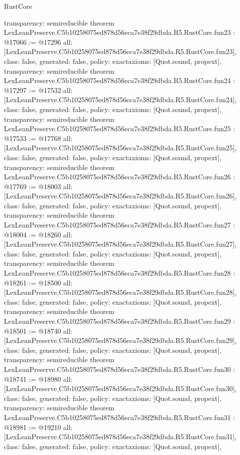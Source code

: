 \begin{lexlean}{RustCore}
\begin{coremodule}
{  transparency: semireducible
}
theorem LexLeanPreserve.C5b10258075ed878d56eca7e38f29dbda.R5.RustCore.fun23 : @17066 := @17296 {
  all: [LexLeanPreserve.C5b10258075ed878d56eca7e38f29dbda.R5.RustCore.fun23],
  class: false,
  generated: false,
  policy: exact{axioms: [Quot.sound, propext]},
  transparency: semireducible
}
theorem LexLeanPreserve.C5b10258075ed878d56eca7e38f29dbda.R5.RustCore.fun24 : @17297 := @17532 {
  all: [LexLeanPreserve.C5b10258075ed878d56eca7e38f29dbda.R5.RustCore.fun24],
  class: false,
  generated: false,
  policy: exact{axioms: [Quot.sound, propext]},
  transparency: semireducible
}
theorem LexLeanPreserve.C5b10258075ed878d56eca7e38f29dbda.R5.RustCore.fun25 : @17533 := @17768 {
  all: [LexLeanPreserve.C5b10258075ed878d56eca7e38f29dbda.R5.RustCore.fun25],
  class: false,
  generated: false,
  policy: exact{axioms: [Quot.sound, propext]},
  transparency: semireducible
}
theorem LexLeanPreserve.C5b10258075ed878d56eca7e38f29dbda.R5.RustCore.fun26 : @17769 := @18003 {
  all: [LexLeanPreserve.C5b10258075ed878d56eca7e38f29dbda.R5.RustCore.fun26],
  class: false,
  generated: false,
  policy: exact{axioms: [Quot.sound, propext]},
  transparency: semireducible
}
theorem LexLeanPreserve.C5b10258075ed878d56eca7e38f29dbda.R5.RustCore.fun27 : @18004 := @18260 {
  all: [LexLeanPreserve.C5b10258075ed878d56eca7e38f29dbda.R5.RustCore.fun27],
  class: false,
  generated: false,
  policy: exact{axioms: [Quot.sound, propext]},
  transparency: semireducible
}
theorem LexLeanPreserve.C5b10258075ed878d56eca7e38f29dbda.R5.RustCore.fun28 : @18261 := @18500 {
  all: [LexLeanPreserve.C5b10258075ed878d56eca7e38f29dbda.R5.RustCore.fun28],
  class: false,
  generated: false,
  policy: exact{axioms: [Quot.sound, propext]},
  transparency: semireducible
}
theorem LexLeanPreserve.C5b10258075ed878d56eca7e38f29dbda.R5.RustCore.fun29 : @18501 := @18740 {
  all: [LexLeanPreserve.C5b10258075ed878d56eca7e38f29dbda.R5.RustCore.fun29],
  class: false,
  generated: false,
  policy: exact{axioms: [Quot.sound, propext]},
  transparency: semireducible
}
theorem LexLeanPreserve.C5b10258075ed878d56eca7e38f29dbda.R5.RustCore.fun30 : @18741 := @18980 {
  all: [LexLeanPreserve.C5b10258075ed878d56eca7e38f29dbda.R5.RustCore.fun30],
  class: false,
  generated: false,
  policy: exact{axioms: [Quot.sound, propext]},
  transparency: semireducible
}
theorem LexLeanPreserve.C5b10258075ed878d56eca7e38f29dbda.R5.RustCore.fun31 : @18981 := @19210 {
  all: [LexLeanPreserve.C5b10258075ed878d56eca7e38f29dbda.R5.RustCore.fun31],
  class: false,
  generated: false,
  policy: exact{axioms: [Quot.sound, propext]},
}
\end{coremodule}
\end{lexlean}
